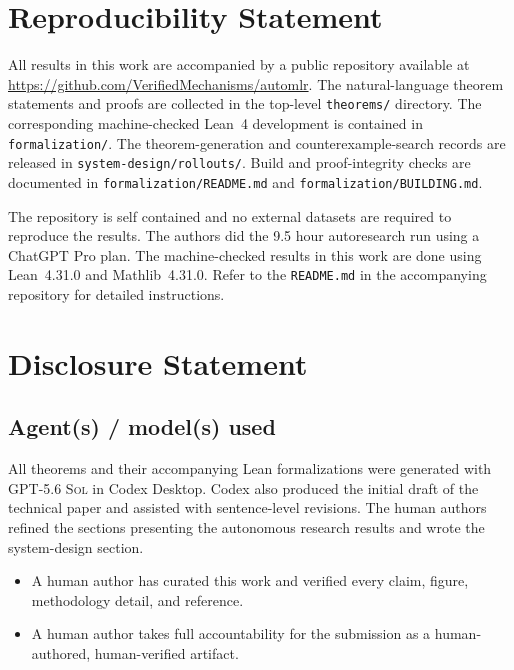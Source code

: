 \documentclass{article}
\theoremstyle{definition}
\theoremstyle{plain}
\newcommand{\gpt}{\textsc{GPT-5.6 Sol}\xspace}
\begin{document}
\clearpage
\appendix
\section{Reproducibility Statement}
All results in this work are accompanied by a public repository available at \url{https://github.com/VerifiedMechanisms/automlr}. The natural-language theorem statements and proofs are collected in the top-level \texttt{theorems/} directory. The corresponding machine-checked Lean~4 development is contained in \texttt{formalization/}. The theorem-generation and counterexample-search records are released in \texttt{system-design/rollouts/}. Build and proof-integrity checks are documented in \texttt{formalization/README.md} and \texttt{formalization/BUILDING.md}.

The repository is self contained and no external datasets are required to reproduce the results. The authors did the 9.5 hour autoresearch run using a ChatGPT Pro plan. The machine-checked results in this work are done using Lean~4.31.0 and Mathlib~4.31.0. Refer to the \texttt{README.md} in the accompanying repository for detailed instructions. 

\section{Disclosure Statement}

\subsection*{Agent(s) / model(s) used}

All theorems and their accompanying Lean formalizations were generated with \gpt{} in Codex Desktop. Codex also produced the initial draft of the technical paper and assisted with sentence-level revisions. The human authors refined the sections presenting the autonomous research results and wrote the system-design section.

\begin{itemize}[leftmargin=1.8em,nosep]
  \item[$\boxed{\checkmark}$] A human author has curated this work and verified every claim, figure, methodology detail, and reference.
  \item[$\boxed{\checkmark}$]  A human author takes full accountability for the submission as a human-authored, human-verified artifact.
\end{itemize}
\end{document}
